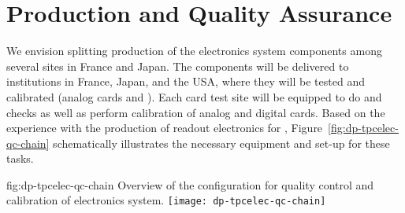 \section{Production and Quality Assurance}
\label{sec:dp-tpcelec-production}

We envision splitting production of the electronics system components among several sites in France and Japan.  
The components will be delivered to institutions in France, Japan, and the USA, where they will be tested and calibrated (analog  cards and ). Each card test site will be equipped to do  and  checks as well as perform calibration of analog and digital cards. Based on the experience with the production of  readout electronics for , Figure~\ref{fig:dp-tpcelec-qc-chain} schematically illustrates the necessary equipment and set-up for these tasks.

\begin{dunefigure}{fig:dp-tpcelec-qc-chain}
{Overview of the configuration for quality control and calibration of  electronics system.}
\texttt{[image: dp-tpcelec-qc-chain]}
\end{dunefigure}

